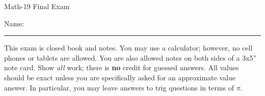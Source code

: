 \documentclass[letterpaper,12pt,fleqn]{article}
\begin{document}
\begin{center}
\Large Math-19 Final Exam
\end{center}

\vspace{0.25in}

Name: \rule{4in}{1pt}

\vspace{0.25in}

This exam is closed book and notes. You may use a calculator; however, no cell
phones or tablets are allowed. You are also allowed notes on both sides of a
3x5'' note card. Show \emph{all} work; there is \textbf{no} credit for guessed
answers. All values should be exact unless you are specifically asked for an
approximate value answer.  In particular, you may leave answers to trig
questions in terms of $\pi$.

\vspace{0.25in}
\end{document}
